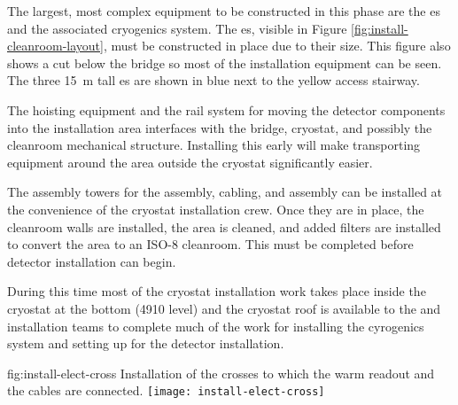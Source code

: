 The largest, most complex equipment to be constructed in this phase are the \coldbox{}es and %
the associated cryogenics system. 
The \coldbox{}es, visible in Figure \ref{fig:install-cleanroom-layout}, must be constructed in place due to their size.  
This figure also shows a cut  below the bridge so most of the installation equipment can be seen. 
The three \SI{15}{m} tall  \coldbox{}es are shown in blue next to the yellow access stairway. 

The hoisting equipment and the rail system for moving the detector components into the installation area interfaces with the bridge, cryostat, and possibly the cleanroom mechanical structure. 
Installing this early will make transporting equipment around the area outside the cryostat significantly easier. 
 
The assembly towers for the  assembly,  cabling, and  assembly can be installed at the convenience of the cryostat installation crew. Once they are in place, the cleanroom walls are installed, the area is cleaned, and added  filters are installed to convert the area to an ISO-8 cleanroom. This must be completed before detector installation can begin.

During this time %
most of the cryostat installation work takes place inside the cryostat at the bottom (4910 level) and  %
the cryostat roof is available to the  and  installation teams to complete  
much of the work for installing the cyrogenics system and setting up for the detector installation.  %


\begin{dunefigure}{fig:install-elect-cross}
  {Installation of the crosses to which the  warm readout and the  cables are connected.}
 \texttt{[image: install-elect-cross]}
\end{dunefigure}

